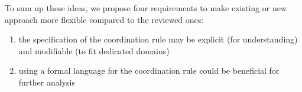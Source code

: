 To sum up these ideas, we propose four requirements to make existing or new approach more flexible compared to the reviewed ones:

\begin{enumerate}
\item the specification of the coordination rule may be explicit (for understanding) and modifiable (to fit dedicated domains)
\item using a formal language for the coordination rule could be beneficial for further analysis
\end{enumerate}

%	
%		
%		
%     
	
	
	
	
	
	
	
	
		
	 	
